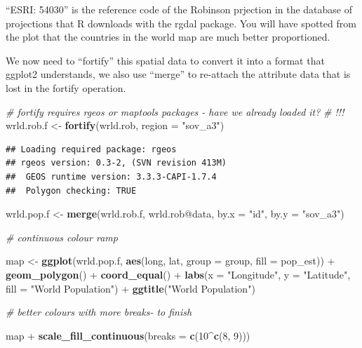 \documentclass[]{article}
\newenvironment{Shaded}{}{}
\newcommand{\KeywordTok}[1]{\textcolor[rgb]{0.00,0.44,0.13}{\textbf{{#1}}}}
\newcommand{\DataTypeTok}[1]{\textcolor[rgb]{0.56,0.13,0.00}{{#1}}}
\newcommand{\DecValTok}[1]{\textcolor[rgb]{0.25,0.63,0.44}{{#1}}}
\newcommand{\StringTok}[1]{\textcolor[rgb]{0.25,0.44,0.63}{{#1}}}
\newcommand{\CommentTok}[1]{\textcolor[rgb]{0.38,0.63,0.69}{\textit{{#1}}}}
\newcommand{\NormalTok}[1]{{#1}}
\begin{document}
``ESRI: 54030'' is the reference code of the Robinson prjection in the
database of projections that R downloads with the rgdal package. You
will have spotted from the plot that the countries in the world map are
much better proportioned.

We now need to ``fortify'' this spatial data to convert it into a format
that ggplot2 understands, we also use ``merge'' to re-attach the
attribute data that is lost in the fortify operation.

\begin{Shaded}
\begin{Highlighting}[]
\CommentTok{# fortify requires rgeos or maptools packages - have we already loaded it?}
\CommentTok{# !!!}
\NormalTok{wrld.rob.f <-}\StringTok{ }\KeywordTok{fortify}\NormalTok{(wrld.rob, }\DataTypeTok{region =} \StringTok{"sov_a3"}\NormalTok{)}
\end{Highlighting}
\end{Shaded}

\begin{verbatim}
## Loading required package: rgeos
## rgeos version: 0.3-2, (SVN revision 413M)
##  GEOS runtime version: 3.3.3-CAPI-1.7.4 
##  Polygon checking: TRUE
\end{verbatim}

\begin{Shaded}
\begin{Highlighting}[]

\NormalTok{wrld.pop.f <-}\StringTok{ }\KeywordTok{merge}\NormalTok{(wrld.rob.f, wrld.rob@data, }\DataTypeTok{by.x =} \StringTok{"id"}\NormalTok{, }\DataTypeTok{by.y =} \StringTok{"sov_a3"}\NormalTok{)}
\end{Highlighting}
\end{Shaded}

\begin{Shaded}
\begin{Highlighting}[]
\CommentTok{# continuous colour ramp}

\NormalTok{map <-}\StringTok{ }\KeywordTok{ggplot}\NormalTok{(wrld.pop.f, }\KeywordTok{aes}\NormalTok{(long, lat, }\DataTypeTok{group =} \NormalTok{group, }\DataTypeTok{fill =} \NormalTok{pop_est)) +}\StringTok{ }\KeywordTok{geom_polygon}\NormalTok{() +}\StringTok{ }
\StringTok{    }\KeywordTok{coord_equal}\NormalTok{() +}\StringTok{ }\KeywordTok{labs}\NormalTok{(}\DataTypeTok{x =} \StringTok{"Longitude"}\NormalTok{, }\DataTypeTok{y =} \StringTok{"Latitude"}\NormalTok{, }\DataTypeTok{fill =} \StringTok{"World Population"}\NormalTok{) +}\StringTok{ }
\StringTok{    }\KeywordTok{ggtitle}\NormalTok{(}\StringTok{"World Population"}\NormalTok{)}

\CommentTok{# better colours with more breaks- to finish}

\NormalTok{map +}\StringTok{ }\KeywordTok{scale_fill_continuous}\NormalTok{(}\DataTypeTok{breaks =} \KeywordTok{c}\NormalTok{(}\DecValTok{10}\NormalTok{^}\KeywordTok{c}\NormalTok{(}\DecValTok{8}\NormalTok{, }\DecValTok{9}\NormalTok{)))}
\end{Highlighting}
\end{Shaded}
\end{document}
